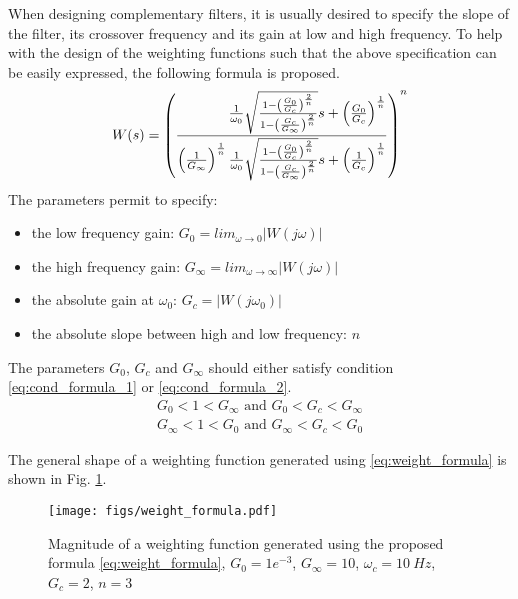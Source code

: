 \documentclass[letterpaper, 10 pt, conference]{ieeeconf}
\begin{document}
When designing complementary filters, it is usually desired to specify the slope of the filter, its crossover frequency and its gain at low and high frequency.
To help with the design of the weighting functions such that the above specification can be easily expressed, the following formula is proposed.
\begin{equation}
\label{eq:weight_formula}
  W(s) = \left( \frac{
           \hfill{} \frac{1}{\omega_0} \sqrt{\frac{1 - \left(\frac{G_0}{G_c}\right)^{\frac{2}{n}}}{1 - \left(\frac{G_c}{G_\infty}\right)^{\frac{2}{n}}}} s + \left(\frac{G_0}{G_c}\right)^{\frac{1}{n}}
         }{
           \left(\frac{1}{G_\infty}\right)^{\frac{1}{n}} \frac{1}{\omega_0} \sqrt{\frac{1 - \left(\frac{G_0}{G_c}\right)^{\frac{2}{n}}}{1 - \left(\frac{G_c}{G_\infty}\right)^{\frac{2}{n}}}} s + \left(\frac{1}{G_c}\right)^{\frac{1}{n}}
         }\right)^n
\end{equation}
The parameters permit to specify:
\begin{itemize}
\item the low frequency gain: \(G_0 = lim_{\omega \to 0} |W(j\omega)|\)
\item the high frequency gain: \(G_\infty = lim_{\omega \to \infty} |W(j\omega)|\)
\item the absolute gain at \(\omega_0\): \(G_c = |W(j\omega_0)|\)
\item the absolute slope between high and low frequency: \(n\)
\end{itemize}

The parameters \(G_0\), \(G_c\) and \(G_\infty\) should either satisfy condition \eqref{eq:cond_formula_1} or \eqref{eq:cond_formula_2}.
\begin{subequations}
\label{eq:condition_params_formula}
  \begin{align}
    G_0 < 1 < G_\infty \text{ and } G_0 < G_c < G_\infty \label{eq:cond_formula_1}\\
    G_\infty < 1 < G_0 \text{ and } G_\infty < G_c < G_0 \label{eq:cond_formula_2}
  \end{align}
\end{subequations}

The general shape of a weighting function generated using \eqref{eq:weight_formula} is shown in Fig. \ref{fig:weight_formula}.

\begin{figure}[htbp]
\centering
\texttt{[image: figs/weight\_formula.pdf]}
\caption{\label{fig:weight_formula}
Magnitude of a weighting function generated using the proposed formula \eqref{eq:weight_formula}, \(G_0 = 1e^{-3}\), \(G_\infty = 10\), \(\omega_c = \SI{10}{Hz}\), \(G_c = 2\), \(n = 3\)}
\end{figure}
\end{document}
